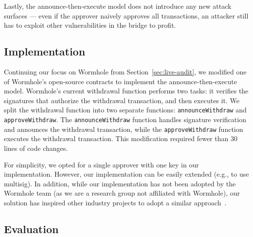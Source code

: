Lastly, the announce-then-execute model does not
introduce any new attack surfaces --- even if the approver naively
approves all transactions, an attacker still has to exploit other
vulnerabilities in the bridge to profit.

\subsection{Implementation}


Continuing our focus on Wormhole from Section~\ref{sec:live-audit}, we
modified one of Wormhole's open-source contracts to implement the
announce-then-execute model.  Wormhole's current withdrawal function
performs two tasks: it verifies the signatures that authorize the
withdrawal transaction, and then executes it. We
split the withdrawal function into two separate functions:
\texttt{announceWithdraw} and \texttt{approveWithdraw}. The
\texttt{announceWithdraw} function handles signature verification and
announces the withdrawal transaction,
while the \texttt{approveWithdraw} function executes the withdrawal
transaction. This modification required fewer than 30 lines of code
changes.

For simplicity, we opted for a single approver with one key in our implementation. However, our implementation can be easily extended (e.g., to use multisig). In addition, while our implementation has not been adopted by the Wormhole team (as we are a research group not affiliated with Wormhole), our solution has inspired other industry projects to adopt a similar approach~\cite{bascule}.

\subsection{Evaluation}

